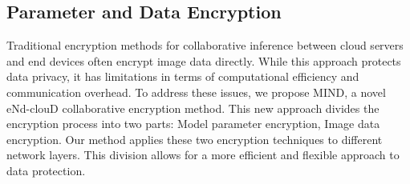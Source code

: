 ﻿\documentclass[conference]{IEEEtran}
\begin{document}


 \subsection{Parameter and Data Encryption}
Traditional encryption methods for collaborative inference between cloud servers and end devices often encrypt image data directly. While this approach protects data privacy, it has limitations in terms of computational efficiency and communication overhead. To address these issues, we propose MIND, a novel eNd-clouD collaborative encryption method. This new approach divides the encryption process into two parts: Model parameter encryption, Image data encryption. Our method applies these two encryption techniques to different network layers. This division allows for a more efficient and flexible approach to data protection.
\end{document}
